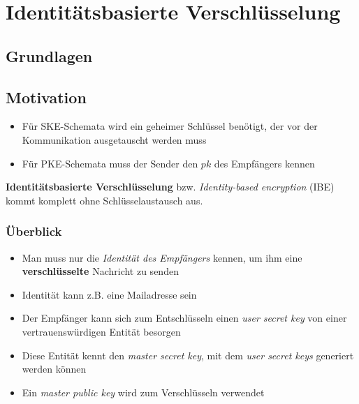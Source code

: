 \documentclass[12pt,A4]{extarticle}
\newcommand{\highlight}[1]{\textcolor{highlightColor}{\textbf{#1}}}
\begin{document}
\newpage
\section{Identitätsbasierte Verschlüsselung}
\subsection{Grundlagen}
\subsection{Motivation}
\begin{itemize}
  \item{Für SKE-Schemata wird ein geheimer Schlüssel benötigt, der vor der Kommunikation ausgetauscht werden muss}
  \item{Für PKE-Schemata muss der Sender den $pk$ des Empfängers kennen}
\end{itemize}
\highlight{Identitätsbasierte Verschlüsselung} bzw. \textit{Identity-based encryption} (IBE) kommt komplett ohne Schlüsselaustausch aus.

\subsubsection{Überblick}
\begin{itemize}
  \item{Man muss nur die \textit{Identität des Empfängers} kennen, um ihm eine \textbf{verschlüsselte} Nachricht zu senden}
  \item{Identität kann z.B. eine Mailadresse sein}
  \item{Der Empfänger kann sich zum Entschlüsseln einen \textit{user secret key} von einer vertrauenswürdigen Entität besorgen}
  \item{Diese Entität kennt den \textit{master secret key}, mit dem \textit{user secret keys} generiert werden können}
  \item{Ein \textit{master public key} wird zum Verschlüsseln verwendet}
\end{itemize}
\end{document}
